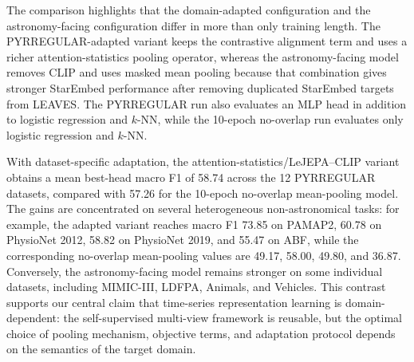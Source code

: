 The comparison highlights that the domain-adapted configuration and the
astronomy-facing configuration differ in more than only training length.  The
PYRREGULAR-adapted variant keeps the contrastive alignment term and uses a
richer attention-statistics pooling operator, whereas the astronomy-facing
model removes CLIP and uses masked mean pooling because that combination gives
stronger StarEmbed performance after removing duplicated StarEmbed targets from
LEAVES.  The PYRREGULAR run also evaluates an MLP head in addition to logistic
regression and $k$-NN, while the 10-epoch no-overlap run evaluates only
logistic regression and $k$-NN.

With dataset-specific adaptation, the attention-statistics/LeJEPA--CLIP variant
obtains a mean best-head macro F1 of 58.74 across the 12 PYRREGULAR datasets,
compared with 57.26 for the 10-epoch no-overlap mean-pooling model.  The gains
are concentrated on several heterogeneous non-astronomical tasks: for example,
the adapted variant reaches macro F1 73.85 on PAMAP2, 60.78 on PhysioNet 2012,
58.82 on PhysioNet 2019, and 55.47 on ABF, while the corresponding no-overlap
mean-pooling values are 49.17, 58.00, 49.80, and 36.87.  Conversely, the
astronomy-facing model remains stronger on some individual datasets, including
MIMIC-III, LDFPA, Animals, and Vehicles.  This contrast supports our central
claim that time-series representation learning is domain-dependent: the
self-supervised multi-view framework is reusable, but the optimal choice of
pooling mechanism, objective terms, and adaptation protocol depends on the
semantics of the target domain.

